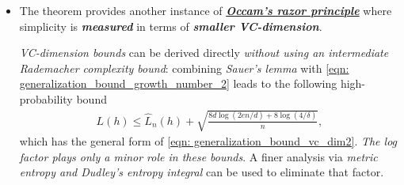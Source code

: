 \documentclass[11pt]{article}
\begin{document}
\begin{itemize}
\item \begin{remark}
The theorem provides another instance of \underline{\emph{\textbf{Occam's razor principle}}} where simplicity is \emph{\textbf{measured}} in terms of \emph{\textbf{smaller VC-dimension}}.

\emph{VC-dimension bounds} can be derived directly \emph{without using an intermediate Rademacher complexity bound}: combining \emph{Sauer’s lemma} with \eqref{eqn: generalization_bound_growth_number_2} leads to the following high-probability bound
\begin{align}
L(h) \le \widehat{L}_{n}(h) + \sqrt{\frac{8d\log(2en /d) + 8\log(4/\delta)}{n}},  \label{eqn: generalization_bound_vc_dim3}
\end{align}
which has the general form of \eqref{eqn: generalization_bound_vc_dim2}. \emph{The log factor plays only a minor role in these bounds}. A finer analysis via \emph{metric entropy and Dudley's entropy integral} can be used  to eliminate that factor.
\end{remark}

\end{itemize}
\end{document}
